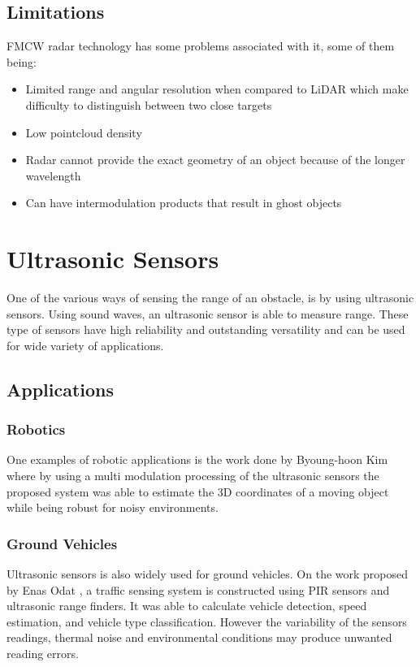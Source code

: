  
\subsection{Limitations}
\ac{FMCW} {radar} technology has some problems associated with it, some of them being:
\begin{itemize}
\item{Limited range and angular resolution when compared to \ac{LiDAR} which make difficulty to distinguish between two close targets}  
\item{Low pointcloud density}  
\item{Radar cannot provide the exact geometry of an object because of the longer wavelength}  
\item{Can have intermodulation products that result in ghost objects} 
\end{itemize}





\section{Ultrasonic Sensors}
One of the various ways  of  sensing the range of an obstacle, is by using ultrasonic sensors. Using sound waves, an ultrasonic sensor is able to measure range. 
These type of sensors have high reliability and outstanding versatility and can be used for wide variety of applications. 

\subsection{Applications}
\subsubsection{Robotics}
One examples of robotic applications is the work done by Byoung-hoon Kim \cite{kim2006improved} where by using a multi modulation processing of the ultrasonic sensors the proposed system was able to estimate the 3D coordinates of a moving object while being robust for noisy environments.
\subsubsection{Ground Vehicles}
Ultrasonic sensors is also widely used for ground vehicles. On the work  proposed by Enas Odat \cite{pir}, a traffic sensing system is constructed using \ac{PIR} sensors and ultrasonic range finders. It was able to calculate  vehicle detection, speed estimation, and vehicle type classification. However the variability of the sensors readings, thermal noise and environmental conditions may produce unwanted reading errors.
